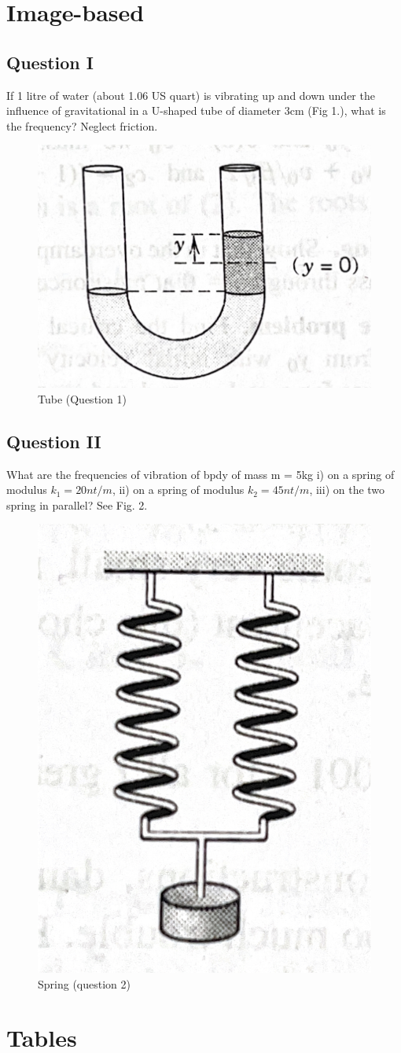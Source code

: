\documentclass[a4paper]{article}
\begin{document}
\newpage
\section{Image-based}
\subsection*{Question I}
If 1 litre of water (about 1.06 US quart) is vibrating up and down under the influence of gravitational in a U-shaped tube of diameter 3cm (Fig 1.), what is the frequency? Neglect friction.

\begin{figure}[h] 

\begin{center}
\includegraphics[width=.25\textwidth]{tube}
\caption{Tube (Question 1)}
 \label{fig1}
\end{center}

\end{figure}
\subsection*{Question II}
What are the frequencies of vibration of bpdy of mass m = 5kg i) on a spring of modulus $k_1 = 20 nt/m$, ii) on a spring of modulus $k_2 = 45 nt/m$, iii) on the two spring in parallel? See Fig. 2.

\begin{figure}[h]
 \begin{center}
  \includegraphics[width=.25\textwidth]{spring}
  \caption{Spring (question 2)}
 \label{fig2}
 \end{center}
\end{figure}


\newpage
\section{Tables}
\end{document}
